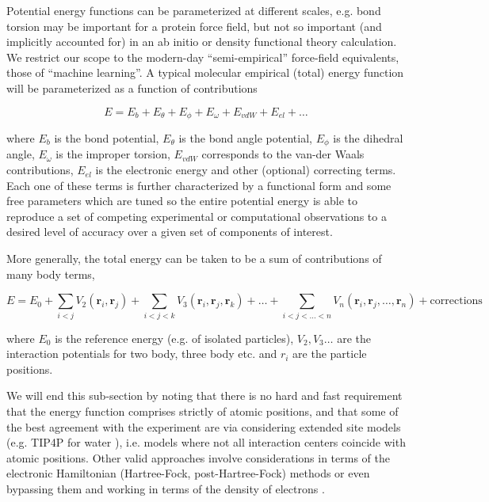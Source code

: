 \documentclass[9pt,bestpractices]{livecoms}
\begin{document}
Potential energy functions can be parameterized at different scales, e.g. bond torsion may be important for a protein force field, but not so important (and implicitly accounted for) in an ab initio or density functional theory calculation. We restrict our scope to the modern-day ``semi-empirical'' force-field equivalents, those of ``machine learning''. A typical molecular
empirical (total) energy function will be parameterized as a function of contributions \cite{brooksCHARMMProgramMacromolecular1983}

\[
  E = E_{b} + E_{\theta} + E_{\phi} + E_{\omega} + E_{vdW} + E_{el} + \ldots
\]

\noindent where $E_{b}$ is the bond potential, $E_{\theta}$ is the bond angle potential,
$E_{\phi}$ is the dihedral angle, $E_{\omega}$ is the improper torsion, $E_{vdW}$
corresponds to the van-der Waals contributions, $E_{el}$ is the electronic energy
and other (optional) correcting terms. Each one of these terms is further characterized by a functional form and
some free parameters which are tuned so the entire potential energy is able to
reproduce a set of competing experimental or computational observations to a desired level of accuracy over a given
set of components of interest.

More generally, the total energy can be taken to be a sum of contributions of many
body terms, \cite{stoneTheoryIntermolecularForces2013}

\[
  E = E_{0} + \sum_{i<j} V_{2}(\mathbf{r}_{i}, \mathbf{r}_{j}) + \sum_{i<j<k} V_{3}(\mathbf{r}_{i}, \mathbf{r}_{j}, \mathbf{r}_{k}) + \ldots + \sum_{i<j<\ldots<n} V_{n}(\mathbf{r}_{i}, \mathbf{r}_{j}, \ldots, \mathbf{r}_{n}) + \text{{corrections}} \]

\noindent where $E_{0}$ is the reference energy (e.g. of isolated particles),
$V_{2}, V_{3}\ldots$ are the interaction potentials for two body, three body etc. and
$r_{i}$ are the particle positions.

We will end this sub-section by noting that there is no hard and fast requirement
that the energy function comprises strictly of atomic positions, and that some of the best agreement with the experiment
\cite{prernaStudyIceNucleation2019,goswamiHomogeneousNucleationSheared2021} are
via considering extended site models (e.g. TIP4P for water \cite{Abascal2005}), i.e. models where not all interaction centers coincide with atomic positions.
Other valid approaches involve considerations in terms of the electronic
Hamiltonian (Hartree-Fock, post-Hartree-Fock) methods or even bypassing them and
working in terms of the density of electrons \cite{burschBestPracticeDFT2022,huangCentralRoleDensity2023}.
\end{document}
